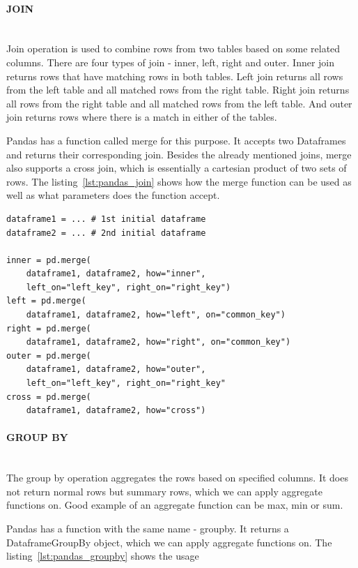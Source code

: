 \paragraph{JOIN} \leavevmode \\

Join operation is used to combine rows from two tables based on some related columns.
There are four types of join - inner, left, right and outer.
Inner join returns rows that have matching rows in both tables.
Left join returns all rows from the left table and all matched rows from the right table.
Right join returns all rows from the right table and all matched rows from the left table.
And outer join returns rows where there is a match in either of the tables.

Pandas has a function called merge for this purpose.
It accepts two Dataframes and returns their corresponding join.
Besides the already mentioned joins, merge also supports a cross join, which is essentially a cartesian product of
two sets of rows.
The listing~\ref{lst:pandas_join} shows how the merge function can be used as well as what parameters does the
function accept.

\begin{lstlisting}[caption=Join in Pandas, label={lst:pandas_join}, captionpos=b]
dataframe1 = ... # 1st initial dataframe
dataframe2 = ... # 2nd initial dataframe

inner = pd.merge(
    dataframe1, dataframe2, how="inner",
    left_on="left_key", right_on="right_key")
left = pd.merge(
    dataframe1, dataframe2, how="left", on="common_key")
right = pd.merge(
    dataframe1, dataframe2, how="right", on="common_key")
outer = pd.merge(
    dataframe1, dataframe2, how="outer",
    left_on="left_key", right_on="right_key"
cross = pd.merge(
    dataframe1, dataframe2, how="cross")
\end{lstlisting}

\paragraph{GROUP BY} \leavevmode \\

The group by operation aggregates the rows based on specified columns.
It does not return normal rows but summary rows, which we can apply aggregate functions on.
Good example of an aggregate function can be max, min or sum.

Pandas has a function with the same name - groupby.
It returns a DataframeGroupBy object, which we can apply aggregate functions on.
The listing~\ref{lst:pandas_groupby} shows the usage

